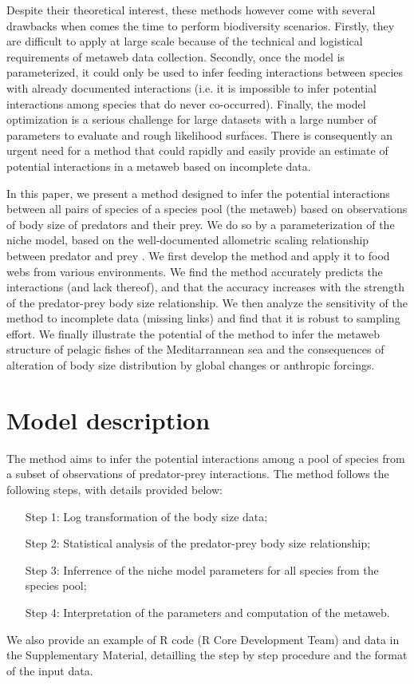 \documentclass[12pt]{article}
\begin{document}
Despite their theoretical interest, these methods however come with several drawbacks when comes the time to perform biodiversity scenarios. Firstly, they are difficult to apply at large scale because of the technical and logistical requirements of metaweb data collection. Secondly, once the model is parameterized, it could only be used to infer feeding interactions between species with already documented interactions (i.e. it is impossible to infer potential interactions among species that do never co-occurred). Finally, the model optimization is a serious challenge for large datasets with a large number of parameters to evaluate and rough likelihood surfaces. There is consequently an urgent need for a method that could rapidly and easily provide an estimate of potential interactions in a metaweb based on incomplete data. 

In this paper, we present a method designed to infer the potential interactions between all pairs of species of a species pool (the metaweb) based on observations of body size of predators and their prey. We do so by a parameterization of the niche model, based on the well-documented allometric scaling relationship between predator and prey \parencite{Cohen2003, Brose2006, Riede2010}. We first develop the method and apply it to food webs from various environments. We find the method accurately predicts the interactions (and lack thereof), and that the accuracy increases with the strength of the predator-prey body size relationship. We then analyze the sensitivity of the method to incomplete data (missing links) and find that it is robust to sampling effort. We finally illustrate the potential of the method to infer the metaweb structure of pelagic fishes of the Meditarrannean sea and the consequences of alteration of body size distribution by global changes or anthropic forcings. 

\section{Model description}

The method aims to infer the potential interactions among a pool of species from a subset of observations of predator-prey interactions. The method follows the following steps, with details provided below: 
\begin{itemize}
\item[Step 1:] Log transformation of the body size data;
\item[Step 2:] Statistical analysis of the predator-prey body size relationship;
\item[Step 3:] Inferrence of the niche model parameters for all species from the species pool;
\item[Step 4:] Interpretation of the parameters and computation of the metaweb.
\end{itemize}
We also provide an example of R code (R Core Development Team) and data in the Supplementary Material, detailling the step by step procedure and the format of the input data. 
\end{document}
